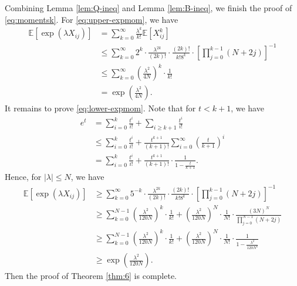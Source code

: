 \documentclass{amsart}
\theoremstyle{plain}
\theoremstyle{definition}
\theoremstyle{remark}
\newcommand{\EE}{\mathbb{E}}
\begin{document}
 Combining Lemma \ref{lem:Q-ineq} and Lemma \ref{lem:B-ineq}, we finish the proof of \eqref{eq:momentsk}.  For \eqref{eq:upper-expmom}, we have
 \begin{align*}
     \EE[\exp(\lambda X_{ij})]&=\sum\limits_{k=0}^{\infty}\frac{\lambda^k}{k!}\EE[X_{ij}^k]\\
     &\leq\sum\limits_{k=0}^{\infty}2^k\cdot\frac{\lambda^{2k}}{(2k)!}\cdot \frac{(2k)!}{k! 8^k}\cdot \left[\prod_{j=0}^{k-1}(N+2j)\right]^{-1}\\
     &\leq \sum\limits_{k=0}^{\infty}\left(\frac{\lambda^2}{4N}\right)^k\cdot \frac{1}{k!}\\
     &=\exp\left(\frac{\lambda^2}{4N}\right).
 \end{align*}
It remains to prove \eqref{eq:lower-expmom}. Note that for $t<k+1$, we have
\begin{align*}
    e^t&=\sum\limits_{i=0}^{k}\frac{t^i}{i!}+\sum\limits_{i\geq k+1}\frac{t^i}{i!}\\
    &\leq \sum\limits_{i=0}^{k}\frac{t^i}{i!} +\frac{t^{k+1}}{(k+1)!}\sum\limits_{i=0}^{\infty}\left(\frac{t}{k+1}\right)^i\\
    &= \sum\limits_{i=0}^{k}\frac{t^i}{i!} +\frac{t^{k+1}}{(k+1)!}\cdot\frac{1}{1-\frac{t}{k+1}}.
\end{align*}
 Hence, for $|\lambda|\leq N$, we have
 \begin{align*}
     \EE[\exp(\lambda X_{ij})]&\geq\sum\limits_{k=0}^{\infty}5^{-k}\cdot\frac{\lambda^{2k}}{(2k)!}\cdot \frac{(2k)!}{k! 8^k}\cdot \left[\prod_{j=0}^{k-1}(N+2j)\right]^{-1}\\
     &\geq \sum\limits_{k=0}^{N-1}\left(\frac{\lambda^2}{120N}\right)^k\cdot \frac{1}{k!}+\left(\frac{\lambda^2}{120N}\right)^N\cdot\frac{1}{N!}\cdot\frac{(3N)^N}{\prod_{j=0}^{N-1}(N+2j)}\\
     &\geq \sum\limits_{k=0}^{N-1}\left(\frac{\lambda^2}{120N}\right)^k\cdot \frac{1}{k!}+\left(\frac{\lambda^2}{120N}\right)^N\cdot\frac{1}{N!}\cdot\frac{1}{1-\frac{\lambda^2}{120N^2}} \\
     &\geq \exp\left(\frac{\lambda^2}{120N}\right).
 \end{align*}
 Then the proof of Theorem \ref{thm:6} is complete.
\end{document}
